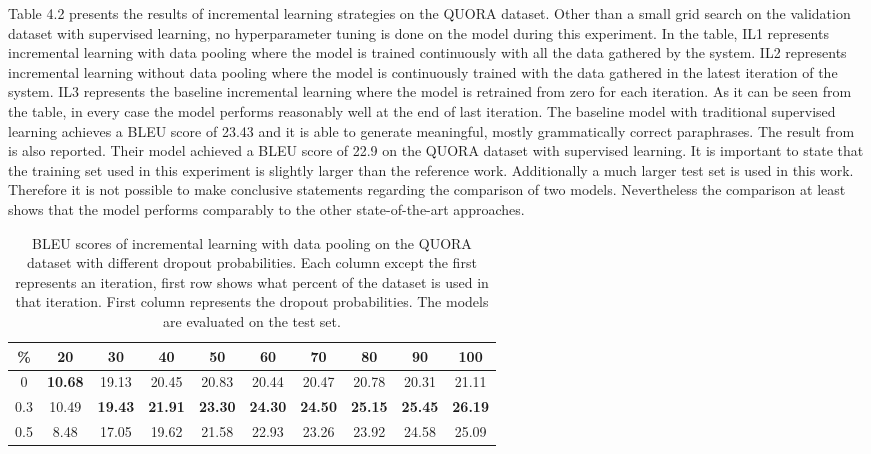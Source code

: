 Table 4.2 presents the results of incremental learning strategies on the QUORA dataset. Other than a small grid search on the validation dataset with supervised learning, no hyperparameter tuning is done on the model during this experiment. In the table, IL1 represents incremental learning with data pooling where the model is trained continuously with all the data gathered by the system. IL2 represents incremental learning without data pooling where the model is continuously trained with the data gathered in the latest iteration of the system. IL3 represents the baseline incremental learning where the model is retrained from zero for each iteration. As it can be seen from the table, in every case the model performs reasonably well at the end of last iteration. The baseline model with traditional supervised learning achieves a BLEU score of 23.43 and it is able to generate meaningful, mostly grammatically correct paraphrases. The result from \cite{Guptaetal} is also reported. Their model achieved a BLEU score of 22.9 on the QUORA dataset with supervised learning. It is important to state that the training set used in this experiment is slightly larger than the reference work. Additionally a much larger test set is used in this work. Therefore it is not possible to make conclusive statements regarding the comparison of two models. Nevertheless the comparison at least shows that the model performs comparably to the other state-of-the-art approaches.

\begin{table}[t]
\centering
\small
 \begin{tabular}{|c | c | c | c | c | c | c | c | c | c |} 
 \hline
 \% & 20 & 30 & 40 & 50 & 60 & 70 & 80 & 90 & 100 \\ [0.5ex] 
 \hline
  0 & \textbf{10.68} & 19.13 & 20.45 & 20.83 & 20.44 & 20.47 & 20.78 & 20.31 & 21.11  \\ 
 \hline
  0.3 & 10.49 & \textbf{19.43} & \textbf{21.91} & \textbf{23.30} & \textbf{24.30} & \textbf{24.50} & \textbf{25.15} & \textbf{25.45} & \textbf{26.19} \\ 
 \hline
  0.5 & 8.48 & 17.05 & 19.62 & 21.58 & 22.93 & 23.26 & 23.92 & 24.58 & 25.09 \\ 
 \hline
\end{tabular}
\caption{BLEU scores of incremental learning with data pooling on the QUORA dataset with different dropout probabilities. Each column except the first represents an iteration, first row shows what percent of the dataset is used in that iteration. First column represents the dropout probabilities. The models are evaluated on the test set.}
\end{table}

